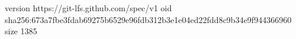 version https://git-lfs.github.com/spec/v1
oid sha256:673a7fbe3fdab69275b6529e96fdb312b3e1e04ed22fdd8c9b34e9f944366960
size 1385
